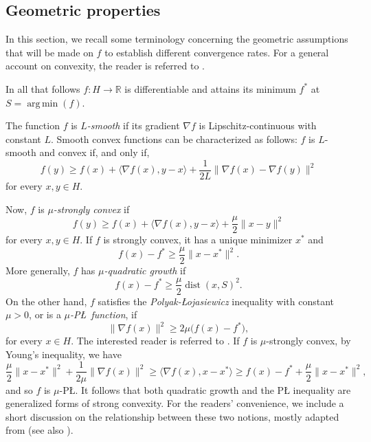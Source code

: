 \documentclass[pdflatex,sn-mathphys-num]{sn-jnl}
\theoremstyle{thmstyleone}
\theoremstyle{thmstyletwo}
\theoremstyle{thmstylethree}
\DeclareMathOperator*{\argmin}{arg\,min}
\DeclareMathOperator{\dist}{dist}
\newcommand{\R}{\mathbb{R}}
\begin{document}




\begin{appendices}


\section{Geometric properties} \label{A:geometry}

In this section, we recall some terminology concerning the geometric assumptions that will be made on $f$ to establish different convergence rates. For a general account on convexity, the reader is referred to \cite{Bauschke_2017,Peypouquet_2015}.

In all that follows $f:H\to\R$ is differentiable and attains its minimum $f^*$ at $S=\argmin(f)$.

The function $f$ is {\it $L$-smooth} if its gradient $\nabla f$ is Lipschitz-continuous with constant $L$. Smooth convex functions can be characterized as follows: $f$ is $L$-smooth and convex if, and only if, 
$$f(y)\ge f(x)+\langle \nabla f(x),y-x\rangle+\frac{1}{2L}\|\nabla f(x)-\nabla f(y)\|^2$$
for every $x,y\in H$.

Now, $f$ is {\it $\mu$-strongly convex} if
$$f(y)\ge f(x)+\langle \nabla f(x),y-x\rangle+\frac{\mu}{2}\|x-y\|^2$$
for every $x,y\in H$. If $f$ is strongly convex, it has a unique minimizer $x^*$ and 
$$f(x) - f^*\ge \frac{\mu}{2}\|x-x^*\|^2.$$
More generally, $f$ has {\it $\mu$-quadratic growth} if 
$$f(x) - f^*\ge \frac{\mu}{2}\dist(x,S)^2.$$
On the other hand, $f$ satisfies the {\it Polyak-\L ojasiewicz} inequality with constant $\mu > 0$, or is a {\it $\mu$-P\L\ function}, if
$$\| \nabla f(x) \|^2 \ge 2\mu \big( f(x) - f^* \big),$$
for every $x\in H$. The interested reader is referred to \cite{Bolte_2017,Polyak_1963,Lojasiewicz_1963,Lojasiewicz_1958,Lojasiewicz_1959}. If $f$ is $\mu$-strongly convex, by Young's inequality, we have
$$ \frac{\mu}{2}\| x - x^* \|^2 + \frac{1}{2\mu}\| \nabla f(x) \|^2 \ge \langle \nabla f(x),x-x^*\rangle \ge f(x)-f^*+\frac{\mu}{2}\|x-x^*\|^2,$$
and so $f$ is $\mu$-P\L. It follows that both quadratic growth and the P{\L} inequality are generalized forms of strong convexity. For the readers' convenience, we include a short discussion on the relationship between these two notions, mostly adapted from 
\cite{Bolte_2017} (see also \cite{Bolte_2007,Bolte_2010}).



\end{appendices}
\end{document}

